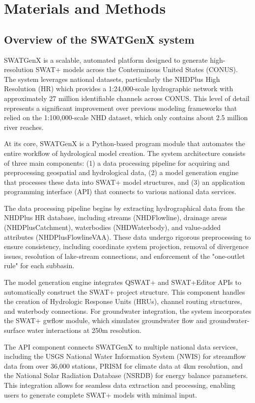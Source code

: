 \documentclass[final,3p,times]{elsarticle}
\begin{document}
\section{Materials and Methods}
\label{sec:methods}

\subsection{Overview of the SWATGenX system}
\label{subsec:system_overview}

SWATGenX is a scalable, automated platform designed to generate high-resolution SWAT+ models across the Conterminous United States (CONUS). The system leverages national datasets, particularly the NHDPlus High Resolution (HR) which provides a 1:24,000-scale hydrographic network with approximately 27 million identifiable channels across CONUS. This level of detail represents a significant improvement over previous modeling frameworks that relied on the 1:100,000-scale NHD dataset, which only contains about 2.5 million river reaches.

At its core, SWATGenX is a Python-based program module that automates the entire workflow of hydrological model creation. The system architecture consists of three main components: (1) a data processing pipeline for acquiring and preprocessing geospatial and hydrological data, (2) a model generation engine that processes these data into SWAT+ model structures, and (3) an application programming interface (API) that connects to various national data services.

The data processing pipeline begins by extracting hydrographical data from the NHDPlus HR database, including streams (NHDFlowline), drainage areas (NHDPlusCatchment), waterbodies (NHDWaterbody), and value-added attributes (NHDPlusFlowlineVAA). These data undergo rigorous preprocessing to ensure consistency, including coordinate system projection, removal of divergence issues, resolution of lake-stream connections, and enforcement of the "one-outlet rule" for each subbasin.

The model generation engine integrates QSWAT+ and SWAT+Editor APIs to automatically construct the SWAT+ project structure. This component handles the creation of Hydrologic Response Units (HRUs), channel routing structures, and waterbody connections. For groundwater integration, the system incorporates the SWAT+ gwflow module, which simulates groundwater flow and groundwater-surface water interactions at 250m resolution.

The API component connects SWATGenX to multiple national data services, including the USGS National Water Information System (NWIS) for streamflow data from over 36,000 stations, PRISM for climate data at 4km resolution, and the National Solar Radiation Database (NSRDB) for energy balance parameters. This integration allows for seamless data extraction and processing, enabling users to generate complete SWAT+ models with minimal input.
\end{document}
